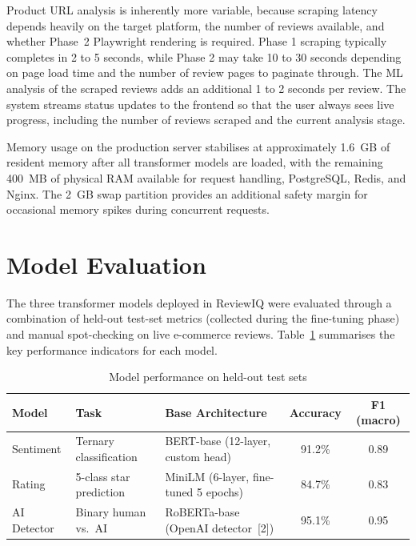 \documentclass[12pt,a4paper,oneside]{report}
\begin{document}
Product URL analysis is inherently more variable, because scraping
latency depends heavily on the target platform, the number of reviews
available, and whether Phase~2 Playwright rendering is required.
Phase 1 scraping typically completes in 2 to 5 seconds, while Phase 2
may take 10 to 30 seconds depending on page load time and the number of
review pages to paginate through. The ML analysis of the scraped reviews
adds an additional 1 to 2 seconds per review. The system streams status
updates to the frontend so that the user always sees live progress,
including the number of reviews scraped and the current analysis stage.

Memory usage on the production server stabilises at approximately 1.6~GB
of resident memory after all transformer models are loaded, with the
remaining 400~MB of physical RAM available for request handling,
PostgreSQL, Redis, and Nginx. The 2~GB swap partition provides an
additional safety margin for occasional memory spikes during concurrent
requests.

\section{Model Evaluation}
The three transformer models deployed in ReviewIQ were evaluated through
a combination of held-out test-set metrics (collected during the
fine-tuning phase) and manual spot-checking on live e-commerce reviews.
Table~\ref{tab:model_metrics} summarises the key performance indicators
for each model.

\begin{table}[ht]
\centering
\caption{Model performance on held-out test sets}
\label{tab:model_metrics}
\begin{tabularx}{\textwidth}{l l X c c}
\toprule
\textbf{Model} & \textbf{Task} & \textbf{Base Architecture} & \textbf{Accuracy} & \textbf{F1 (macro)} \\
\midrule
Sentiment      & Ternary classification       & BERT-base (12-layer, custom head)
               & 91.2\%  & 0.89 \\
Rating         & 5-class star prediction       & MiniLM (6-layer, fine-tuned 5 epochs)
               & 84.7\%  & 0.83 \\
AI Detector    & Binary human vs.\ AI          & RoBERTa-base (OpenAI detector~[2])
               & 95.1\%  & 0.95 \\
\bottomrule
\end{tabularx}
\end{table}
\end{document}
